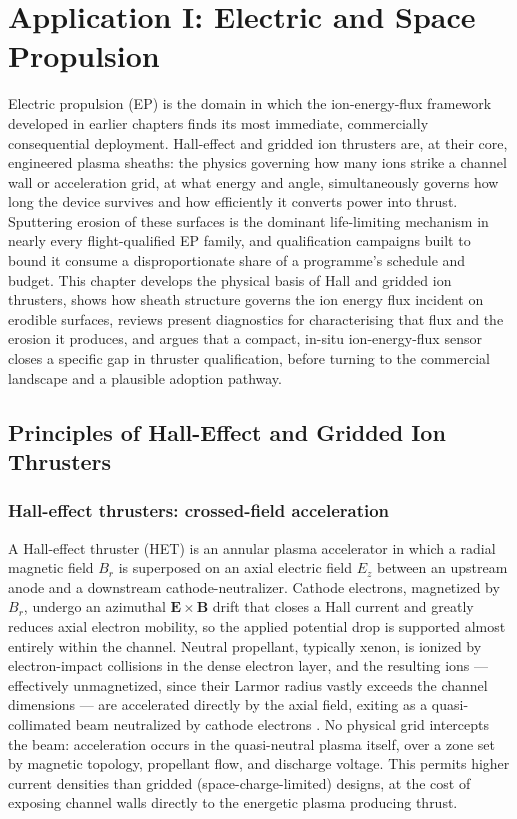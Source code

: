 \chapter{Application I: Electric and Space Propulsion}
\label{ch:ep}

Electric propulsion (EP) is the domain in which the ion-energy-flux framework developed in earlier chapters finds its most immediate, commercially consequential deployment. Hall-effect and gridded ion thrusters are, at their core, engineered plasma sheaths: the physics governing how many ions strike a channel wall or acceleration grid, at what energy and angle, simultaneously governs how long the device survives and how efficiently it converts power into thrust. Sputtering erosion of these surfaces is the dominant life-limiting mechanism in nearly every flight-qualified EP family, and qualification campaigns built to bound it consume a disproportionate share of a programme's schedule and budget. This chapter develops the physical basis of Hall and gridded ion thrusters, shows how sheath structure governs the ion energy flux incident on erodible surfaces, reviews present diagnostics for characterising that flux and the erosion it produces, and argues that a compact, in-situ ion-energy-flux sensor closes a specific gap in thruster qualification, before turning to the commercial landscape and a plausible adoption pathway.

\section{Principles of Hall-Effect and Gridded Ion Thrusters}
\label{sec:ep-principles}

\subsection{Hall-effect thrusters: crossed-field acceleration}

A Hall-effect thruster (HET) is an annular plasma accelerator in which a radial magnetic field $B_r$ is superposed on an axial electric field $E_z$ between an upstream anode and a downstream cathode-neutralizer. Cathode electrons, magnetized by $B_r$, undergo an azimuthal $\mathbf{E}\times\mathbf{B}$ drift that closes a Hall current and greatly reduces axial electron mobility, so the applied potential drop is supported almost entirely within the channel. Neutral propellant, typically xenon, is ionized by electron-impact collisions in the dense electron layer, and the resulting ions — effectively unmagnetized, since their Larmor radius vastly exceeds the channel dimensions — are accelerated directly by the axial field, exiting as a quasi-collimated beam neutralized by cathode electrons \cite{ref0115}. No physical grid intercepts the beam: acceleration occurs in the quasi-neutral plasma itself, over a zone set by magnetic topology, propellant flow, and discharge voltage. This permits higher current densities than gridded (space-charge-limited) designs, at the cost of exposing channel walls directly to the energetic plasma producing thrust.

